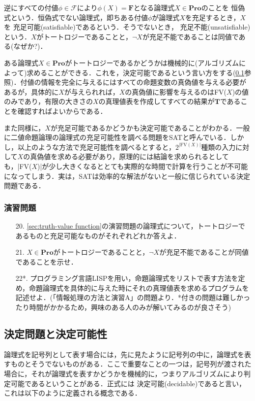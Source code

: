 \documentclass{ltjsarticle}
\theoremstyle{mystyle1}
\theoremstyle{mystyle2}
\newcommand{\bT}{\ensuremath{\mathbf{T}}}
\newcommand{\bF}{\ensuremath{\mathbf{F}}}
\newcommand{\bPro}{\ensuremath{\mathbf{Pro}}}
\newcommand{\cF}{\ensuremath{\mathcal{F}}}
\newcommand{\red}[1]{{\color{red} #1}}
\begin{document}
逆にすべての付値$\phi\in\cF$により$\phi(X) = \bF$となる論理式$X\in\bPro$のことを\red{恒偽}式という．恒偽式でない論理式，即ちある付値$\phi$が論理式$X$を充足するとき，$X$を\red{充足可能}(satisfiable)であるという．そうでないとき，\red{充足不能}(unsatisfiable)という．$X$がトートロジーであることと，$\neg X$が充足不能であることは同値である(なぜか?)．

ある論理式$X\in\bPro$がトートロジーであるかどうかは機械的に(アルゴリズムによって)求めることができる．これを，決定可能であるという言い方をする(\ref{sec:decidable-and-decision problem}参照)．付値の情報を完全に与えるにはすべての命題変数の真偽値を与える必要があるが，具体的に$X$が与えられれば，$X$の真偽値に影響を与えるのはFV($X$)の値のみであり，有限の大きさの$X$の真理値表を作成してすべての結果が$\bT$であることを確認すればよいからである．

また同様に，$X$が充足可能であるかどうかも決定可能であることがわかる．一般に二値命題論理の論理式の充足可能性を調べる問題をSATと呼んでいる．しかし，以上のような方法で充足可能性を調べるとすると，$2^{|\textrm{FV}(X)|}$種類の入力に対して$X$の真偽値を求める必要があり，原理的には結論を求められるとしても，|FV($X$)|が少し大きくなるととても実際的な時間で計算を行うことが不可能になってしまう．実は，SATは効率的な解法がないと一般に信じられている決定問題である．
\subsubsection*{演習問題}
\begin{enumerate}
  \item[20.] \ref{sec:truth-value function}の演習問題の論理式について，トートロジーであるものと充足可能なものがそれぞれどれか答えよ．
  \item[21.] $X\in\bPro$がトートロジーであることと，$\neg X$が充足不能であることが同値であることを示せ．
  \item[22*.] プログラミング言語LISPを用い，命題論理式をリストで表す方法を定め，命題論理式を具体的に与えた時にそれの真理値表を求めるプログラムを記述せよ．(「情報処理の方法と演習A」の問題より．*付きの問題は難しかったり時間がかかるため，興味のある人のみが解いてみるのが良さそう)
\end{enumerate}
\subsection{決定問題と決定可能性}\label{sec:decidable-and-decision problem}
論理式を記号列として表す場合には，先に見たように記号列の中に，論理式を表すものとそうでないものがある．ここで重要なことの一つは，記号列が渡された場合に，それが論理式を表すかどうかを機械的に，つまりアルゴリズムにより判定可能であるということがある．正式には\red{決定可能}(decidable)であると言い，これは以下のように定義される概念である．
\end{document}
